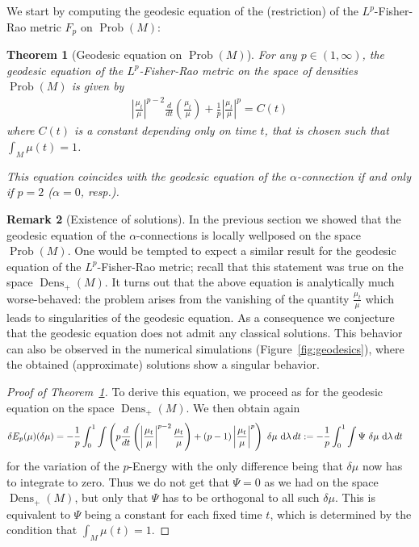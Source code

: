 \documentclass[11pt]{amsart}
\newtheorem{theorem}{Theorem}[section]
\theoremstyle{definition}
\newtheorem{remark}[theorem]{Remark}
\newcommand{\Abs}[1]{\left|#1\right|}
\newcommand{\dx}{\lambda}
\newcommand{\Prob}{\operatorname{Prob}(M)}
\newcommand{\Dens}{\operatorname{Dens}_+(M)}
\newcommand{\ud}{\textup{d}}
\begin{document}
We start by computing the geodesic equation of the (restriction) of the $L^p$-Fisher-Rao metric $F_p$ on $\Prob$:
\begin{theorem}[Geodesic equation on $\Prob$]\label{thm:LpFR_geo_prob}
For any $p\in(1,\infty)$, the geodesic equation of the $L^p$-Fisher-Rao metric on the space of densities $\Prob$ is given by
\begin{align}
\Abs{\frac{\mu_t}{\mu}}^{p-2}\frac{d }{dt}\left(\frac{\mu_t}{\mu}\right)+\frac{1}{p}\Abs{\frac{\mu_t}{\mu}}^p=C(t)
\end{align}
where $C(t)$ is  a constant depending only on time $t$, that is chosen such that $\int_M \mu(t) =1$.

This equation coincides with the geodesic equation of the $\alpha$-connection if and only if $p=2$ ($\alpha=0$, resp.).
\end{theorem}
\begin{remark}[Existence of solutions]
In the previous section we showed that the geodesic equation of the $\alpha$-connections is locally wellposed on the space $\Prob$. One would be tempted to expect a similar result for the geodesic equation of the $L^p$-Fisher-Rao metric; recall that this statement was true on the space $\Dens$. 
It turns out that the above equation is analytically much worse-behaved: the problem arises from the vanishing of the quantity $\frac{\mu_t}{\mu}$ which leads to singularities of the geodesic equation. As a consequence we conjecture that the geodesic equation does not admit any classical solutions. This behavior can also be observed in the numerical simulations (Figure~\ref{fig:geodesics}), where the obtained (approximate) solutions show a singular behavior.        
\end{remark}
\begin{proof}[Proof of Theorem~\ref{thm:LpFR_geo_prob}]
To derive this equation, we proceed as for the geodesic equation on the space $\Dens$. We then obtain again 
\begin{equation*}
\begin{aligned}
\delta E_p(\mu)(\delta \mu)
&=-\frac{1}{p}\int_0 ^1 \int  \left( p\frac{d}{dt}\left(\Abs{\frac{\mu_{t}}{\mu}}^{p-2}\frac{\mu_t}{\mu}\right)+(p-1)\Abs{\frac{\mu_t}{\mu}}^p \right) \  \delta \mu\ \ud \dx\, dt:=-\frac{1}{p} \int_0 ^1 \int  \Psi \  \delta \mu\ \ud \dx\, dt
\end{aligned}
\end{equation*}
for the variation of the $p$-Energy with the only difference being that $\delta \mu$ now has to integrate to zero.
Thus we do not get that $\Psi=0$ as we had on the space $\Dens$, but   only that $\Psi$ has to be orthogonal to all such $\delta \mu$. This is equivalent to $\Psi$ being a constant for each fixed time $t$, which is determined by the condition that $\int_M \mu(t)=1$.
\end{proof}
\end{document}
